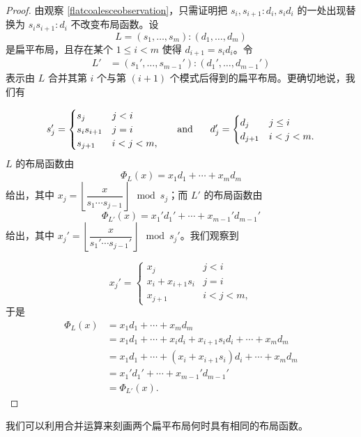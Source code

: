\begin{proof}
由观察 \ref{flatcoalesceobservation}，只需证明把 $s_i,s_{i+1}:d_i,s_id_i$ 的一处出现替换为 $s_is_{i+1}:d_i$ 不改变布局函数。设
\[
L = (s_1,\dots,s_m):(d_1,\dots,d_m)
\]
是扁平布局，且存在某个 $1 \leq i < m$ 使得 $d_{i+1} = s_id_i$。令
    \begin{align*} L' & = (s_1',\dots,s_{m-1}'):(d_1',\dots,d_{m-1}')
    \end{align*}
    表示由 $L$ 合并其第 $i$ 个与第 $(i+1)$ 个模式后得到的扁平布局。更确切地说，我们有

    \[
    s_j' = \begin{cases} s_j & j < i\\
    s_is_{i+1} & j = i \\
    s_{j+1} & i<j<m,
    \end{cases}
    \hspace{0.2in}\text{ and } \hspace{0.2in} d_j' = \begin{cases} d_j & j \leq i\\
    d_{j+1} & i<j<m.
    \end{cases}
    \]
    $L$ 的布局函数由
    \[
    \Phi_L(x) = x_1 d_1 + \cdots + x_m d_m
    \]
    给出，其中 $x_j = \left\lfloor \dfrac{x}{s_1\cdots s_{j-1}} \right \rfloor \mod s_j$；而 $L'$ 的布局函数由
    \[
    \Phi_{L'}(x) = x_1' d_1' + \cdots + x_{m-1}'d_{m-1}'
    \]
    给出，其中 $x_j' = \left\lfloor \dfrac{x}{s_1'\cdots s_{j-1}'} \right \rfloor \mod s_j'$。我们观察到

    \[
    x_j' =
    \begin{cases}
        x_j & j < i \\
        x_i + x_{i+1}s_i & j = i\\
        x_{j+1} & i < j < m,
    \end{cases}
    \]
    于是
    \begin{align*}
        \Phi_L(x) & = x_1 d_1 + \cdots + x_m d_m \\
        & = x_1 d_1 + \cdots + x_i d_i + x_{i+1}s_id_i + \cdots + x_m d_m\\
        & = x_1d_1 + \cdots + (x_i + x_{i+1} s_i) d_i + \cdots + x_m d_m \\
        & = x_1'd_1' + \cdots + x_{m-1}'d_{m-1}'\\
        & = \Phi_{L'}(x).
    \end{align*}

\end{proof}

\noindent 我们可以利用合并运算来刻画两个扁平布局何时具有相同的布局函数。

